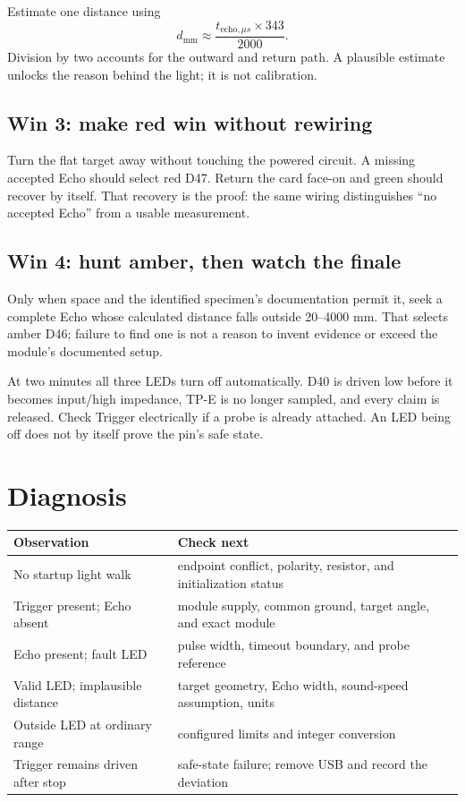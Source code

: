 \documentclass[11pt]{article}
\begin{document}
Estimate one distance using
\[
d_{\mathrm{mm}}\approx
\frac{t_{\mathrm{echo},\mu s}\times343}{2000}.
\]
Division by two accounts for the outward and return path. A plausible estimate
unlocks the reason behind the light; it is not calibration.

\subsection{Win 3: make red win without rewiring}

Turn the flat target away without touching the powered circuit. A missing
accepted Echo should select red D47. Return the card face-on and green should
recover by itself. That recovery is the proof: the same wiring distinguishes
``no accepted Echo'' from a usable measurement.

\subsection{Win 4: hunt amber, then watch the finale}

Only when space and the identified specimen's documentation permit it, seek a
complete Echo whose calculated distance falls outside 20--4000 mm. That selects
amber D46; failure to find one is not a reason to invent evidence or exceed the
module's documented setup.

At two minutes all three LEDs turn off automatically. D40 is driven low before
it becomes input/high impedance, TP-E is no longer sampled, and every claim is
released. Check Trigger electrically if a probe is already attached. An LED
being off does not by itself prove the pin's safe state.

\section{Diagnosis}

\begin{tabularx}{\linewidth}{@{}l X@{}}
\toprule
Observation & Check next\\
\midrule
No startup light walk & endpoint conflict, polarity, resistor, and initialization status\\
Trigger present; Echo absent & module supply, common ground, target angle, and exact module\\
Echo present; fault LED & pulse width, timeout boundary, and probe reference\\
Valid LED; implausible distance & target geometry, Echo width, sound-speed assumption, units\\
Outside LED at ordinary range & configured limits and integer conversion\\
Trigger remains driven after stop & safe-state failure; remove USB and record the deviation\\
\bottomrule
\end{tabularx}
\end{document}

